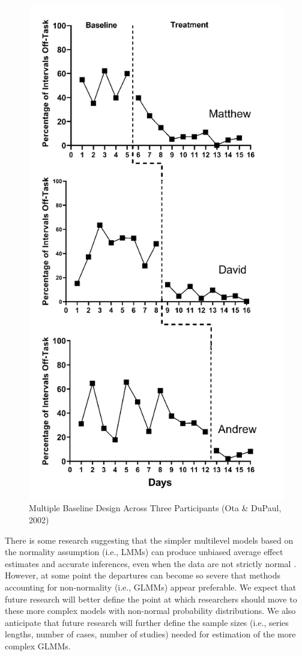 \documentclass[
]{book}
\begin{document}
\begin{figure}
\includegraphics[width=5.83in]{images/Ota.DuPaul2002} \caption{Multiple Baseline Design Across Three Participants (Ota \& DuPaul, 2002)}\label{fig:otadupaul}
\end{figure}

There is some research suggesting that the simpler multilevel models based on the normality assumption (i.e., LMMs) can produce unbiased average effect estimates and accurate inferences, even when the data are not strictly normal \citep{Declercq2019, Joo_Ferron_2019}.
However, at some point the departures can become so severe that methods accounting for non-normality (i.e., GLMMs) appear preferable.
We expect that future research will better define the point at which researchers should move to these more complex models with non-normal probability distributions.
We also anticipate that future research will further define the sample sizes (i.e., series lengths, number of cases, number of studies) needed for estimation of the more complex GLMMs.
\end{document}
